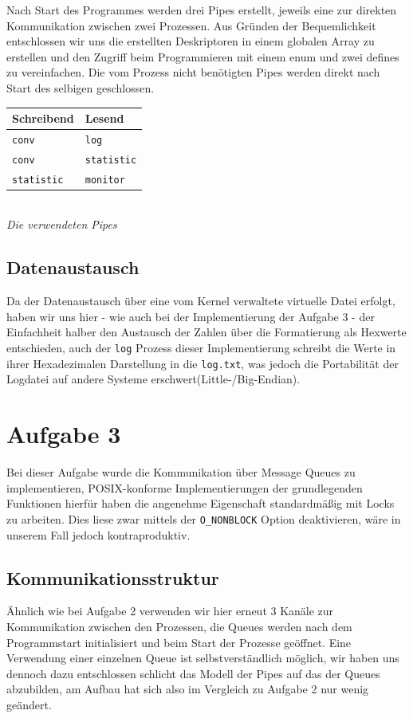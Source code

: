 \documentclass[12pt, a4paper]{scrartcl}
\begin{document}
Nach Start des Programmes werden drei Pipes erstellt, jeweils eine zur direkten
Kommunikation zwischen zwei Prozessen. Aus Gründen der Bequemlichkeit entschlossen 
wir uns die erstellten Deskriptoren in einem globalen Array zu erstellen und den
Zugriff beim Programmieren mit einem enum und zwei defines zu vereinfachen. Die
vom Prozess nicht benötigten Pipes werden direkt nach Start des selbigen geschlossen.\\

\begin{center}
\begin{tabular}{|l|l|}
\hline
	\textbf{Schreibend} & \textbf{Lesend} \\
\hline
	\texttt{conv} & \texttt{log} \\
\hline
	\texttt{conv} & \texttt{statistic} \\
\hline
	\texttt{statistic} & \texttt{monitor}\\
\hline
\end{tabular}\\
\textit{Die verwendeten Pipes}
\end{center}

\subsection{Datenaustausch}
Da der Datenaustausch über eine vom Kernel verwaltete virtuelle Datei erfolgt,
haben wir uns hier - wie auch bei der Implementierung der Aufgabe 3 - der
Einfachheit halber den Austausch der Zahlen über die Formatierung als Hexwerte
entschieden, auch der \texttt{log} Prozess dieser Implementierung schreibt die
Werte in ihrer Hexadezimalen Darstellung in die \texttt{log.txt}, was jedoch die
Portabilität der Logdatei auf andere Systeme erschwert(Little-/Big-Endian).

\clearpage
\section{Aufgabe 3}

Bei dieser Aufgabe wurde die Kommunikation über Message Queues zu implementieren,
POSIX-konforme Implementierungen der grundlegenden Funktionen hierfür haben die
angenehme Eigenschaft standardmäßig mit Locks zu arbeiten. Dies liese zwar mittels 
der \texttt{O\_NONBLOCK} Option deaktivieren, wäre in unserem Fall jedoch 
kontraproduktiv.

\subsection{Kommunikationsstruktur}
Ähnlich wie bei Aufgabe 2 verwenden wir hier erneut 3 Kanäle zur Kommunikation
zwischen den Prozessen, die Queues werden nach dem Programmstart initialisiert
und beim Start der Prozesse geöffnet. Eine Verwendung einer einzelnen Queue ist
selbstverständlich möglich, wir haben uns dennoch dazu entschlossen schlicht das
Modell der Pipes auf das der Queues abzubilden, am Aufbau hat sich also im Vergleich
zu Aufgabe 2 nur wenig geändert.
\end{document}
